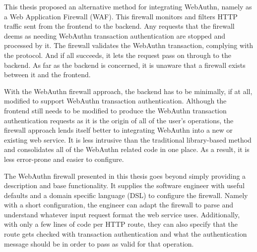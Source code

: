 This thesis proposed an alternative method for integrating WebAuthn, namely as a Web Application Firewall (WAF). This firewall monitors and filters HTTP traffic sent from the frontend to the backend. Any requests that the firewall deems as needing WebAuthn transaction authentication are stopped and processed by it. The firewall validates the WebAuthn transaction, complying with the protocol. And if all succeeds, it lets the request pass on through to the backend. As far as the backend is concerned, it is unaware that a firewall exists between it and the frontend. 

With the WebAuthn firewall approach, the backend has to be minimally, if at all, modified to support WebAuthn transaction authentication. Although the frontend still needs to be modified to produce the WebAuthn transaction authentication requests as it is the origin of all of the user's operations, the firewall approach lends itself better to integrating WebAuthn into a new or existing web service. It is less intrusive than the traditional library-based method and consolidates all of the WebAuthn related code in one place. As a result, it is less error-prone and easier to configure. 




The WebAuthn firewall presented in this thesis goes beyond simply providing a description and base functionality. It supplies the software engineer with useful defaults and a domain specific language (DSL) to configure the firewall. Namely with a short configuration, the engineer can adapt the firewall to parse and understand whatever input request format the web service uses. Additionally, with only a few lines of code per HTTP route, they can also specify that the route gets checked with transaction authentication and what the authentication message should be in order to pass as valid for that operation. 



